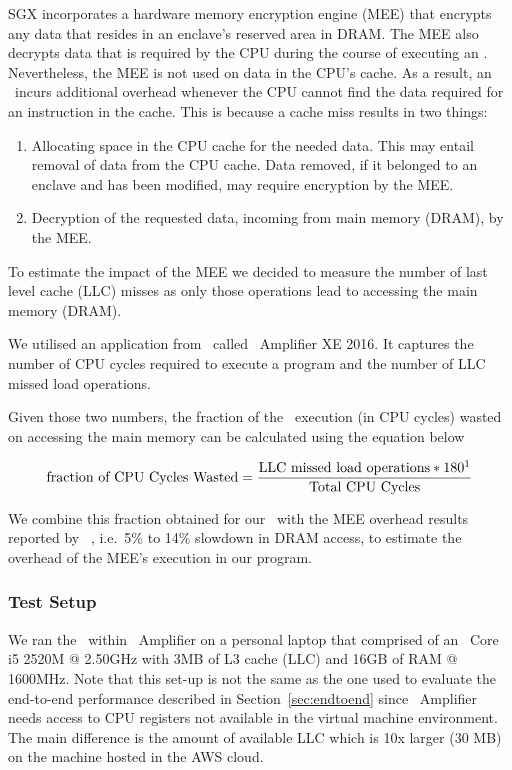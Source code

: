 \documentclass[../../../main.tex]{subfiles}
\begin{document}
\label{sec:mem-analysis}
SGX incorporates a hardware memory encryption engine (MEE) that encrypts any
data that resides in an enclave's reserved area in DRAM. The MEE also decrypts
data that is required by the CPU during the course of executing an
\enclaveprogram. Nevertheless, the MEE is not used on data in the CPU's cache.
As a result, an \enclaveprogram~incurs additional overhead whenever the CPU
cannot find the data required for an instruction in the cache. This is because
a cache miss results in two things:
\begin{enumerate}
  \item Allocating space in the CPU cache for the needed data. This may entail
    removal of data from the CPU cache. Data removed, if it belonged to an
    enclave and has been modified, may require encryption by the MEE.
  \item Decryption of the requested data, incoming from main memory (DRAM), by
    the MEE.
\end{enumerate}

To estimate the impact of the MEE we decided to measure the number of last
level cache (LLC) misses as only those operations lead to accessing the main
memory (DRAM).

We utilised an application from \Intel~called \VTune~Amplifier XE 2016. It
captures the number of CPU cycles required to execute a program and the number
of LLC missed load operations. 

Given those two numbers, the fraction of the \enclaveprogram~execution (in CPU
cycles) wasted on accessing the main memory can be calculated using the
equation below~\cite{intel-eqn}

\begin{align*}
 \text{fraction of CPU Cycles Wasted} = 
    \frac{\text{LLC missed load operations} * 180\footnotemark}
      {\text{Total CPU Cycles}}
\end{align*}


We combine this fraction obtained for our \busywait~with the MEE overhead
results reported by \Intel~\cite{REFERENCE}, i.e.\ 5\% to 14\% slowdown in
DRAM access, to estimate the overhead of the MEE's execution in our program. 

\subsubsection*{Test Setup}
We ran the \enclavemodel~within \VTune~Amplifier on a personal laptop that
comprised of an \Intel~Core i5 2520M @ 2.50GHz with 3MB of L3 cache (LLC) and
16GB of RAM @ 1600MHz. Note that this set-up is not the same as the one used to
evaluate the end-to-end performance described in Section~\ref{sec:endtoend}
since \VTune~Amplifier needs access to CPU registers not available in the
virtual machine environment. The main difference is the amount of available
LLC which is 10x larger (30 MB) on the machine hosted in the AWS cloud.
\end{document}
